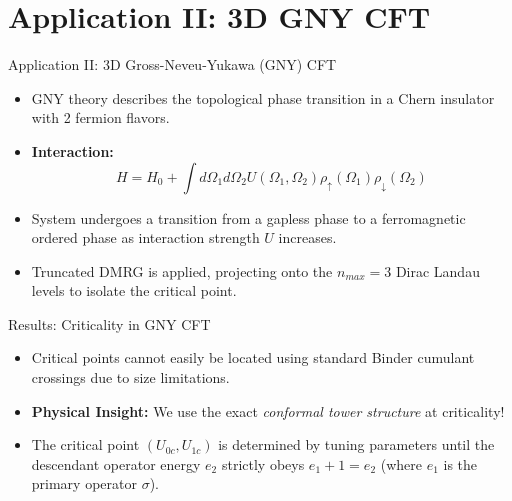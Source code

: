 \documentclass[aspectratio=169]{beamer}
\begin{document}
\section{Application II: 3D GNY CFT}
\begin{frame}{Application II: 3D Gross-Neveu-Yukawa (GNY) CFT}
    \begin{itemize}
        \item GNY theory describes the topological phase transition in a Chern insulator with 2 fermion flavors.
        \item \textbf{Interaction:}
        \begin{equation*}
            H = H_0 + \int d\Omega_1 d\Omega_2 U(\Omega_1, \Omega_2) \rho_{\uparrow}(\Omega_1)\rho_{\downarrow}(\Omega_2)
        \end{equation*}
        \item System undergoes a transition from a gapless phase to a ferromagnetic ordered phase as interaction strength $U$ increases.
        \item Truncated DMRG is applied, projecting onto the $n_{max} = 3$ Dirac Landau levels to isolate the critical point.
    \end{itemize}
\end{frame}

\begin{frame}{Results: Criticality in GNY CFT}
    \begin{itemize}
        \item Critical points cannot easily be located using standard Binder cumulant crossings due to size limitations.
        \item \textbf{Physical Insight:} We use the exact \textit{conformal tower structure} at criticality!
        \item The critical point $(U_{0c}, U_{1c})$ is determined by tuning parameters until the descendant operator energy $e_2$ strictly obeys $e_1 + 1 = e_2$ (where $e_1$ is the primary operator $\sigma$).
    \end{itemize}
\end{frame}
\end{document}

